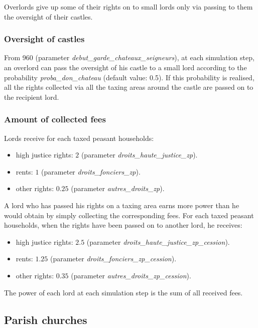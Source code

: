\documentclass[a4paper,11pt]{article}
\begin{document}
{\begin{sloppypar}
Overlords give up some of their rights on to small lords only via passing to them the oversight of their castles.
\end{sloppypar}

\subsubsection{Oversight of castles}

From 960 (parameter \textit{debut\_garde\_chateaux\_seigneurs}), at each simulation step, an overlord can pass the oversight of his castle to a small lord according to the probability \textit{proba\_don\_chateau} (default value: 0.5). If this probability is realised, all the rights collected via all the taxing areas around the castle are passed on to the recipient lord.

\subsubsection{Amount of collected fees}
\begin{sloppypar}
Lords receive for each taxed peasant households:
\begin{itemize}
	\item high justice rights: $2$ (parameter \textit{droits\_haute\_justice\_zp}).
	\item rents: $1$ (parameter \textit{droits\_fonciers\_zp}).
	\item other rights: $0.25$ (parameter \textit{autres\_droits\_zp}).
\end{itemize}
A lord who has passed his rights on a taxing area earns more power than he would obtain by simply collecting the corresponding fees. For each taxed peasant households, when the rights have been passed on to another lord, he receives:
\begin{itemize}
	\item high justice rights: $2.5$ (parameter \textit{droits\_haute\_justice\_zp\_cession}).
	\item rents: $1.25$ (parameter \textit{droits\_fonciers\_zp\_cession}).
	\item other rights: $0.35$ (parameter \textit{autres\_droits\_zp\_cession}).
\end{itemize}
\end{sloppypar}

The power of each lord at each simulation step is the sum of all received fees.


\subsection{Parish churches}

}
\end{document}
